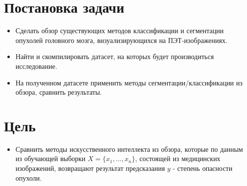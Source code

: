 \section{Постановка задачи}
\begin{itemize}
    \item Сделать обзор существующих методов классификации и сегментации опухолей головного мозга,
    визуализирующихся на ПЭТ-изображениях.
    \item Найти и скомпилировать датасет, на которых будет производиться исследование.
    \item На полученном датасете применить методы сегментации/классификации из обзора, 
    сравнить результаты.
\end{itemize}

\newpage

\section{Цель}
\begin{itemize}
    \item Сравнить методы искусственного интеллекта из обзора, которые по 
    данным из обучающей выборки \(X=\{x_1,\dots,x_n\}\),
    состоящей из медицинских изображений, возвращают результат предсказания \(y\) - степень опасности опухоли.
\end{itemize}


